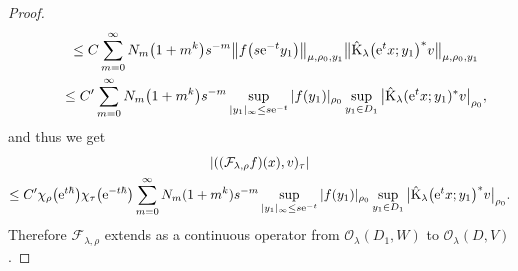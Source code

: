 \documentclass[pdftex]{sigma}
\numberwithin{equation}{section}
\newcommand{\cF}{\mathcal{F}}
\newcommand{\cO}{\mathcal{O}}
\newcommand{\rK}{\mathrm{K}}
\begin{document}
\begin{proof}
\begin{gather*}
\qquad{}\le C\sum_{m=0}^\infty N_m\big(1+m^k\big)
s^{-m}\big\Vert f\big(s{\rm e}^{-t}y_1\big)\big\Vert_{\mu,\rho_0,y_1}\big\Vert\hat{\rK}_\lambda\big({\rm e}^tx;y_1\big)^*v\big\Vert_{\mu,\rho_0,y_1} \\
\qquad{}\le C'\sum_{m=0}^\infty N_m\big(1+m^k\big)
s^{-m}\sup_{|y_1|_\infty\le s{\rm e}^{-t}}|f(y_1)|_{\rho_0}\sup_{y_1\in D_1}\big|\hat{\rK}_\lambda({\rm e}^tx;y_1)^*v\big|_{\rho_0},
\end{gather*}
and thus we get{\samepage
\begin{gather*}
 |((\cF_{\lambda,\rho}f)(x),v)_\tau|\\
 \le C'\chi_\rho\big({\rm e}^{t\hbar}\big)\chi_\tau\big({\rm e}^{-t\hbar}\big)\sum_{m=0}^\infty N_m(1+m^k)
s^{-m}\sup_{|y_1|_\infty\le s{\rm e}^{-t}}|f(y_1)|_{\rho_0}\sup_{y_1\in D_1}\big|\hat{\rK}_\lambda\big({\rm e}^tx;y_1\big)^*v\big|_{\rho_0}.
\end{gather*}
Therefore $\cF_{\lambda,\rho}$ extends as a continuous operator from $\cO_\lambda(D_1,W)$ to $\cO_\lambda(D,V)$.}


\end{proof}
\end{document}
